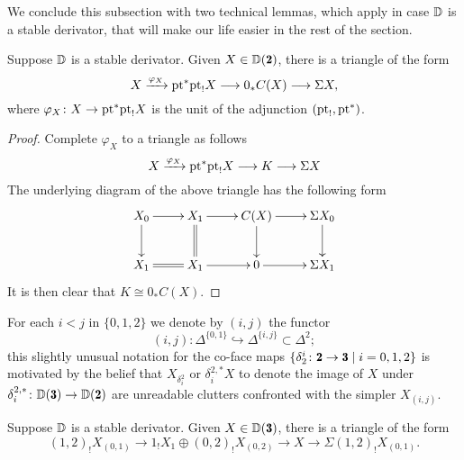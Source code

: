 We conclude this subsection with two technical lemmas, which apply in case $\mathbb{D}$ is a stable derivator, that will make our life easier in the rest of the section. 
\begin{lemma}\label{simple_tria_for_orth}
Suppose $\mathbb{D}$ is a stable derivator. Given $X\in \D(\due)$, there is a triangle of the form
$$X\xrightarrow{\varphi_X} \text{pt}^*\text{pt}_!X\longrightarrow 0_*C(X)\longrightarrow \Sigma X,$$
where $\varphi_X\colon X\to \text{pt}^*\text{pt}_!X$ is the unit of the adjunction $(\text{pt}_!,\text{pt}^*)$.
\end{lemma}
\begin{proof}
Complete $\varphi_X$ to a triangle as follows
\[
X\xrightarrow{\varphi_X} \text{pt}^*\text{pt}_!X\longrightarrow K\longrightarrow \Sigma X
\]
The underlying diagram of the above triangle has the following form
\[
\xymatrix{
X_0\ar[r]\ar[d]&X_1\ar@{=}[d]\ar[r]&C(X)\ar[r]\ar[d]&\Sigma X_0\ar[d]\\
X_1\ar@{=}[r]&X_1\ar[r]&0\ar[r]&\Sigma X_1
}
\]
It is then clear that $K\cong 0_*C(X)$.
\end{proof}
\begin{notat}
For each $i<j$ in $\{0,1,2\}$ we denote by $(i,j)$ the functor 
\[
(i,j)\colon \Delta^{\{0,1\}}\hookrightarrow \Delta^{\{i,j\}}\subset\Delta^{2};
\] 
this slightly unusual notation for the co-face maps $\{\delta_2^i\colon \due\to \tre \mid i=0,1,2\}$ is motivated by the belief that $X_{\delta^2_i}$ or $\delta_i^{2,*}X$ to denote the image of $X$ under $\delta_i^{2,*} \colon \D(\tre)\to \D(\due)$ are unreadable clutters confronted with the simpler $X_{(i,j)}$.
\end{notat}
\begin{lemma}\label{factorization_triangle}
Suppose $\mathbb{D}$ is a stable derivator. Given $X\in \D(\tre)$, there is a triangle of the form
\[
(1,2)_!X_{(0,1)}\to 1_!X_1\oplus (0,2)_!X_{(0,2)}\to X\to \Sigma (1,2)_!X_{(0,1)}.
\]
\end{lemma}
